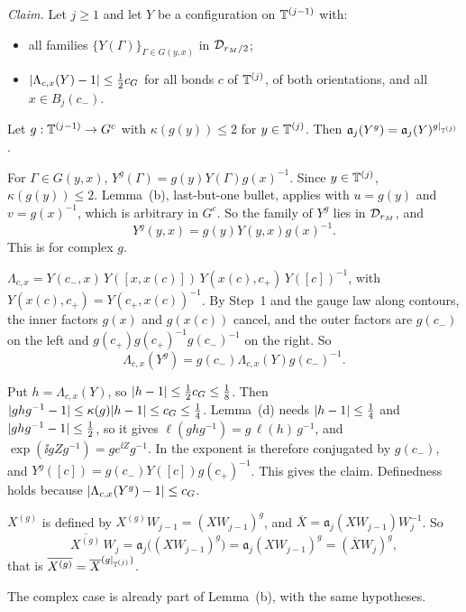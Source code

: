 \begin{detail}\label{xa:d-AB-cov}
\emph{Claim.} Let $j\ge1$ and let $Y$ be a configuration on $\mathbb T^{(j-1)}$ with:
\begin{itemize}
\item all families $\{Y(\Gamma)\}_{\Gamma\in G(y,x)}$ in $\mathcal D_{r_M/2}$;
\item $\lvert\Lambda_{c,x}(Y)-1\rvert\le\frac12c_G$ for all bonds $c$ of $\mathbb T^{(j)}$, of both orientations, and all $x\in B_j(c_-)$.
\end{itemize}
Let $g:\mathbb T^{(j-1)}\to G^c$ with $\kappa(g(y))\le2$ for $y\in\mathbb T^{(j)}$. Then $\mathfrak a_j(Y^g)=\mathfrak a_j(Y)^{g|_{\mathbb T^{(j)}}}$.

\begin{step}
For $\Gamma\in G(y,x)$, $Y^g(\Gamma)=g(y)Y(\Gamma)g(x)^{-1}$. Since $y\in\mathbb T^{(j)}$, $\kappa(g(y))\le2$. Lemma~(b), last-but-one bullet, applies with $u=g(y)$ and $v=g(x)^{-1}$, which is arbitrary in $G^c$. So the family of $Y^g$ lies in $\mathcal D_{r_M}$, and
\[
Y^g(y,x)=g(y)Y(y,x)g(x)^{-1}.
\]
This is  for complex $g$.
\end{step}

\begin{step}
$\Lambda_{c,x}=Y(c_-,x)\,Y([x,x(c)])\,Y(x(c),c_+)\,Y([c])^{-1}$, with $Y(x(c),c_+)=Y(c_+,x(c))^{-1}$. By Step~1 and the gauge law along contours, the inner factors $g(x)$ and $g(x(c))$ cancel, and the outer factors are $g(c_-)$ on the left and $g(c_+)g(c_+)^{-1}g(c_-)^{-1}$ on the right. So
\[
\Lambda_{c,x}(Y^g)=g(c_-)\Lambda_{c,x}(Y)g(c_-)^{-1}.
\]
\end{step}

\begin{step}
Put $h=\Lambda_{c,x}(Y)$, so $\lvert h-1\rvert\le\frac12c_G\le\frac18$. Then $\lvert ghg^{-1}-1\rvert\le\kappa(g)\lvert h-1\rvert\le c_G\le\frac14$. Lemma~(d) needs $\lvert h-1\rvert\le\frac14$ and $\lvert ghg^{-1}-1\rvert\le\frac12$, so it gives $\ell(ghg^{-1})=g\,\ell(h)\,g^{-1}$, and $\exp(\ii gZg^{-1})=ge^{\ii Z}g^{-1}$. In  the exponent is therefore conjugated by $g(c_-)$, and $Y^g([c])=g(c_-)Y([c])g(c_+)^{-1}$. This gives the claim. Definedness holds because $\lvert\Lambda_{c,x}(Y^g)-1\rvert\le c_G$.
\end{step}

\begin{step}
$X^{(g)}$ is defined by $X^{(g)}W_{j-1}=(XW_{j-1})^g$, and $\overline X=\mathfrak a_j(XW_{j-1})W_j^{-1}$. So
\[
\overline{X^{(g)}}\,W_j=\mathfrak a_j\big((XW_{j-1})^g\big)=\mathfrak a_j(XW_{j-1})^{g}=(\overline XW_j)^{g},
\]
that is $\overline{X^{(g)}}=\overline X^{(g|_{\mathbb T^{(j)}})}$.
\end{step}

The complex case is already part of Lemma~(b), with the same hypotheses.
\end{detail}

